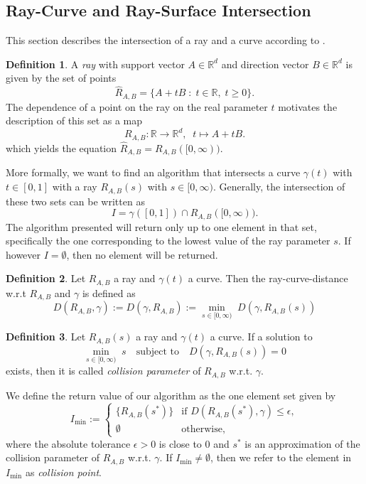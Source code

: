 \documentclass[a4paper, 11pt]{report}
\theoremstyle{definition}
\newtheorem{definition}{Definition}[section]
\renewcommand{\emph}[1]{\textit{#1}}
\begin{document}
\subsection{Ray-Curve and Ray-Surface Intersection}\label{subsec:raymarching}
	This section describes the intersection of a ray and a curve according to \cite{Hart1996}.

	\begin{definition}
		A \emph{ray} with support vector $A \in \mathbb{R}^d$ and direction vector $B \in \mathbb{R}^d$ is given by the set of points
			\begin{equation*}
				\hat R_{A,B} = \{A + tB \;:\; t \in \mathbb{R},\; t \geq 0\}.
			\end{equation*}
		The dependence of a point on the ray on the real parameter $t$ motivates the description of this set as a map
			$$R_{A,B}: \mathbb{R} \rightarrow \mathbb{R}^d,\;\; t \mapsto A+tB.$$
		which yields the equation $\hat R_{A,B} = R_{A,B}([0,\infty))$.
	\end{definition}

	More formally, we want to find an algorithm that intersects a curve $\gamma(t)$ with $t \in [0, 1]$ with a ray $R_{A,B}(s)$ with $s \in [0, \infty)$. Generally, the intersection of these two sets can be written as
		$$I = \gamma([0,1]) \cap R_{A,B}([0,\infty)).$$
	The algorithm presented will return only up to one element in that set, specifically the one corresponding to the lowest value of the ray parameter $s$. If however $I = \emptyset$, then no element will be returned.

	\begin{definition}
		Let $R_{A,B}$ a ray and $\gamma(t)$ a curve. Then the ray-curve-distance w.r.t $R_{A,B}$ and $\gamma$ is defined as
			$$ D(R_{A,B}, \gamma) := D(\gamma, R_{A,B}) := \underset{s\in[0,\infty)}{\min} \; D(\gamma, R_{A,B}(s))$$
	\end{definition}
	
	\begin{definition}\label{def:raycollisionparameter}
		Let $R_{A,B}(s)$ a ray and $\gamma(t)$ a curve. If a solution to 
			$$\underset{s\in[0,\infty)}{\min} \; s \quad \text{subject to} \quad D(\gamma, R_{A,B}(s)) = 0$$
		exists, then it is called \emph{collision parameter} of $R_{A,B}$ w.r.t. $\gamma$.
	\end{definition}

	We define the return value of our algorithm as the one element set given by
		$$ I_{\min} := 
			\begin{cases}
				\{R_{A,B}(s^*)\} 	&\text{if } D(R_{A,B}(s^*), \gamma) \leq \epsilon, \\
				\emptyset			&\text{otherwise,}	
			\end{cases}
		$$
	where the absolute tolerance $\epsilon > 0$ is close to $0$ and $s^*$ is an approximation of the collision parameter of $R_{A,B}$ w.r.t. $\gamma$. If $I_{\min} \neq \emptyset$, then we refer to the element in $I_{\min}$ as \emph{collision point}.
\end{document}
